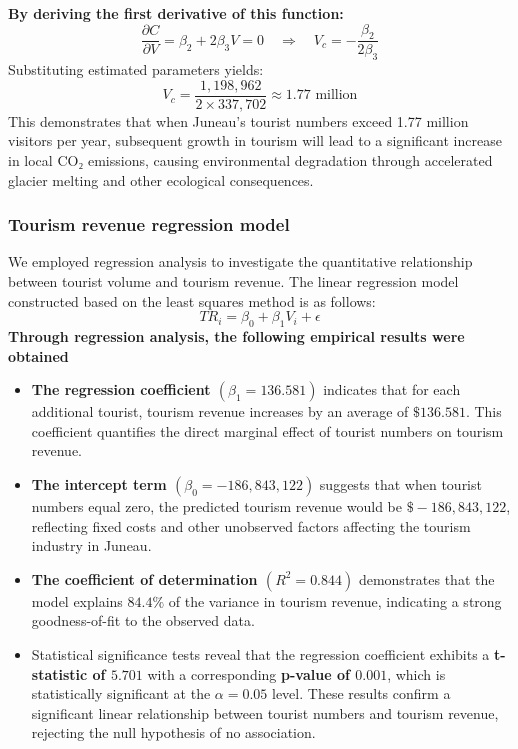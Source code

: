 \documentclass{mcmthesis}
\begin{document}
\textbf{By deriving the first derivative of this function:}
\begin{equation}
  \frac{\partial C}{\partial V} = \beta_2 + 2\beta_3 V = 0 \quad \Rightarrow \quad V_c = -\frac{\beta_2}{2\beta_3}
\end{equation}
Substituting estimated parameters yields:
\begin{equation}
  V_c = \frac{1,198,962}{2 \times 337,702} \approx 1.77 \text{ million}
\end{equation}
This demonstrates that when Juneau's tourist numbers exceed 1.77 million visitors per year, subsequent growth in tourism will lead to a significant increase in local CO₂ emissions, causing environmental degradation through accelerated glacier melting and other ecological consequences.
\subsubsection{Tourism revenue regression model}
We employed regression analysis to investigate the quantitative relationship between tourist volume and tourism revenue. The linear regression model constructed based on the least squares method is as follows:
\begin{equation}
  TR_i = \beta_0 + \beta_1 V_i + \epsilon
\end{equation}
\textbf{Through regression analysis, the following empirical results were obtained}
\begin{itemize}
  \item \textbf{The regression coefficient $(\beta_1 = 136.581)$}  indicates that for each additional tourist, tourism revenue increases by an average of $\$136.581$. This coefficient quantifies the direct marginal effect of tourist numbers on tourism revenue.
  
  \item \textbf{The intercept term $(\beta_0 = -186,843,122)$} suggests that when tourist numbers equal zero, the predicted tourism revenue would be $\$-186,843,122$, reflecting fixed costs and other unobserved factors affecting the tourism industry in Juneau.
  
  \item \textbf{The coefficient of determination $(R^2 = 0.844)$} demonstrates that the model explains $84.4\%$ of the variance in tourism revenue, indicating a strong goodness-of-fit to the observed data.
  
  \item Statistical significance tests reveal that the regression coefficient exhibits a \textbf{t-statistic of $5.701$} with a corresponding \textbf{p-value of $0.001$}, which is statistically significant at the $\alpha = 0.05$ level. These results confirm a significant linear relationship between tourist numbers and tourism revenue, rejecting the null hypothesis of no association. 
\end{itemize}
\end{document}
